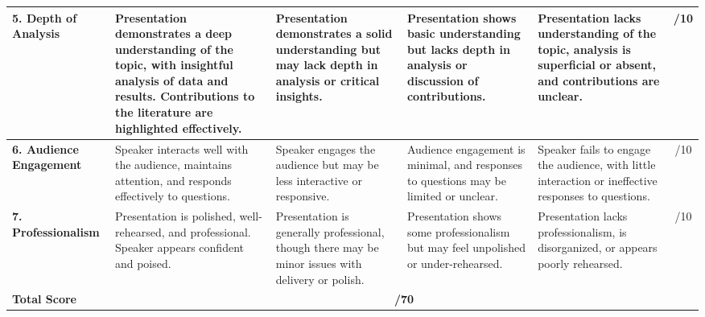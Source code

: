 \documentclass[
]{article}
\begin{document}
\begin{tabular}{| p{2.1cm} | p{3.2cm} | p{3.2cm} | p{3.2cm} | p{3.2cm} | c |}
    \textbf{5. Depth of Analysis} & Presentation demonstrates a deep understanding of the topic, with insightful analysis of data and results. Contributions to the literature are highlighted effectively. & Presentation demonstrates a solid understanding but may lack depth in analysis or critical insights. & Presentation shows basic understanding but lacks depth in analysis or discussion of contributions. & Presentation lacks understanding of the topic, analysis is superficial or absent, and contributions are unclear. & /10 \\
    \hline
    \textbf{6. Audience Engagement} & Speaker interacts well with the audience, maintains attention, and responds effectively to questions. & Speaker engages the audience but may be less interactive or responsive. & Audience engagement is minimal, and responses to questions may be limited or unclear. & Speaker fails to engage the audience, with little interaction or ineffective responses to questions. & /10 \\
    \hline
    \textbf{7. Professionalism} & Presentation is polished, well-rehearsed, and professional. Speaker appears confident and poised. & Presentation is generally professional, though there may be minor issues with delivery or polish. & Presentation shows some professionalism but may feel unpolished or under-rehearsed. & Presentation lacks professionalism, is disorganized, or appears poorly rehearsed. & /10 \\
    \hline
    \textbf{Total Score} & \multicolumn{5}{c|}{\textbf{/70}} \\
    \hline
\end{tabular}
\end{document}
